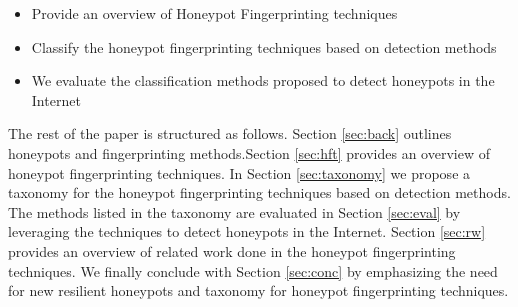  \begin{itemize}
    \item Provide an overview of Honeypot Fingerprinting techniques
    \item Classify the honeypot fingerprinting techniques based on detection methods
    \item We evaluate the classification methods proposed to detect honeypots in the Internet 
 \end{itemize}

The rest of the paper is structured as follows. Section \ref{sec:back} outlines honeypots and fingerprinting methods.Section \ref{sec:hft} provides an overview of  honeypot fingerprinting techniques. In Section \ref{sec:taxonomy} we propose a taxonomy for the honeypot fingerprinting techniques based on detection methods. The methods listed in the taxonomy are evaluated in Section \ref{sec:eval} by leveraging the techniques to detect honeypots in the Internet. Section \ref{sec:rw} provides an overview of related work done in the honeypot fingerprinting techniques. We finally conclude with Section \ref{sec:conc} by emphasizing the need for new resilient honeypots and taxonomy for honeypot fingerprinting techniques.